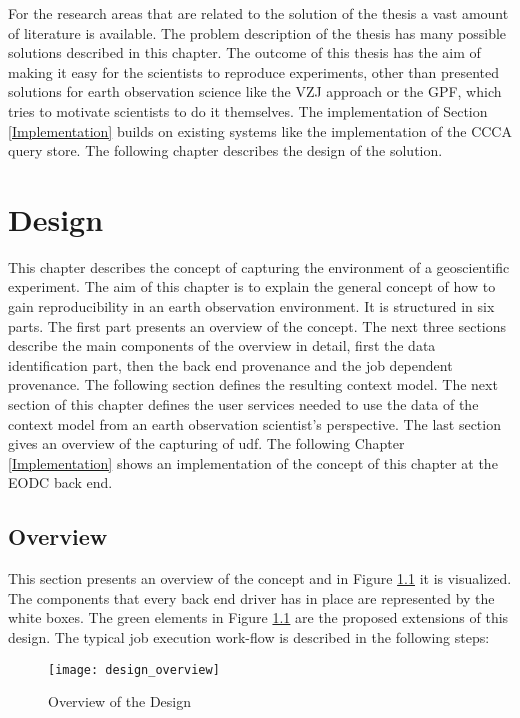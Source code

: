 \documentclass[draft,final]{vutinfth} %
\begin{document}
For the research areas that are related to the solution of the thesis a vast amount of literature is available. The problem description of the thesis has many possible solutions described in this chapter. The outcome of this thesis has the aim of making it easy for the scientists to reproduce experiments, other than presented solutions for earth observation science like the VZJ approach or the GPF, which tries to motivate scientists to do it themselves. The implementation of Section \ref{Implementation} builds on existing systems like the implementation of the CCCA query store. The following chapter describes the design of the solution. 




 
\chapter{Design}\label{Design}
This chapter describes the concept of capturing the environment of a geoscientific experiment. The aim of this chapter is to explain the general concept of how to gain reproducibility in an earth observation environment. It is structured in six parts. The first part presents an overview of the concept. The next three sections describe the main components of the overview in detail, first the data identification part, then the back end provenance and the job dependent provenance. The following section defines the resulting context model. The next section of this chapter defines the user services needed to use the data of the context model from an earth observation scientist's perspective. The last section gives an overview of the capturing of \gls{udf}. The following Chapter \ref{Implementation} shows an implementation of the concept of this chapter at the EODC back end. 



\section{Overview}\label{Design:Overview}
This section presents an overview of the concept and in Figure \ref{fig:overview} it is visualized. The components that every back end driver has in place are represented by the white boxes. The green elements in Figure \ref{fig:overview} are the proposed extensions of this design. The typical job execution work-flow is described in the following steps:

\begin{figure}[h]
	\centering
	\texttt{[image: design\_overview]}
	\caption{Overview of the Design}
	\label{fig:overview} 
\end{figure}
\end{document}
